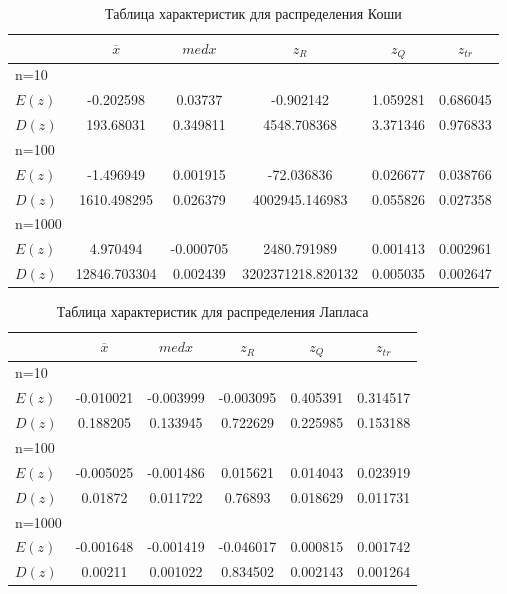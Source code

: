 \documentclass[a4paper,14pt]{article}
\begin{document}
	\begin{table}[H]
		\centering
		\begin{tabular}{|l||c|c|c|c|c|}
			\hline
			& $\overline{x}$ & $med x$ & $z_R$ & $z_Q$ & $z_{tr}$\\\hline\hline
			n=10 & & & & &\\\hline
			$E(z)$ & -0.202598 & 0.03737 & -0.902142 & 1.059281 & 0.686045\\\hline
			$D(z)$ & 193.68031 & 0.349811 & 4548.708368 & 3.371346 & 0.976833\\\hline
			n=100 & & & & &\\\hline
			$E(z)$ & -1.496949 & 0.001915 & -72.036836 & 0.026677 & 0.038766\\\hline
			$D(z)$ & 1610.498295 & 0.026379 & 4002945.146983 & 0.055826 & 0.027358\\\hline
			n=1000 & & & & &\\\hline
			$E(z)$ & 4.970494 & -0.000705 & 2480.791989 & 0.001413 & 0.002961\\\hline
			$D(z)$ & 12846.703304 & 0.002439 & 3202371218.820132 & 0.005035 & 0.002647\\\hline
		\end{tabular}
		\caption{Таблица характеристик для распределения Коши}
		\label{tab:cauchy}
	\end{table}
	
	\begin{table}[H]
		\centering
		\begin{tabular}{|l||c|c|c|c|c|}
			\hline
			& $\overline{x}$ & $med x$ & $z_R$ & $z_Q$ & $z_{tr}$\\\hline\hline
			n=10 & & & & &\\\hline
			$E(z)$ & -0.010021 & -0.003999 & -0.003095 & 0.405391 & 0.314517\\\hline
			$D(z)$ & 0.188205 & 0.133945 & 0.722629 & 0.225985 & 0.153188\\\hline
			n=100 & & & & &\\\hline
			$E(z)$ & -0.005025 & -0.001486 & 0.015621 & 0.014043 &  0.023919\\\hline
			$D(z)$ & 0.01872 & 0.011722 & 0.76893 & 0.018629 & 0.011731\\\hline
			n=1000 & & & & &\\\hline
			$E(z)$ & -0.001648 & -0.001419 & -0.046017 & 0.000815 & 0.001742\\\hline
			$D(z)$ & 0.00211 & 0.001022 & 0.834502 & 0.002143 & 0.001264\\\hline
		\end{tabular}
		\caption{Таблица характеристик для распределения Лапласа}
		\label{tab:laplace}
	\end{table}
	
\end{document}
